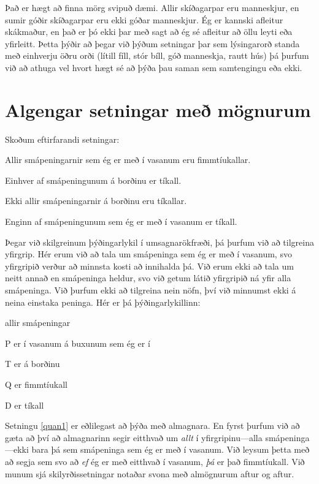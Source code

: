 Það er hægt að finna mörg svipuð dæmi. Allir skíðagarpar eru manneskjur, en sumir góðir skíðagarpar eru ekki góðar manneskjur. Ég er kannski afleitur skákmaður, en það er þó ekki þar með sagt að ég sé afleitur að öllu leyti eða yfirleitt. Þetta þýðir að þegar við þýðum setningar þar sem lýsingarorð standa með einhverju öðru orði (lítill fíll, stór bíll, góð manneskja, rautt hús) þá þurfum við að athuga vel hvort hægt sé að þýða þau saman sem samtengingu eða ekki.

\section{Algengar setningar með mögnurum}
Skoðum eftirfarandi setningar:
	\begin{earg}
		\item[\ex{quan1}] Allir smápeningarnir sem ég er með í vasanum eru fimmtíukallar.
		\item[\ex{quan2}] Einhver af smápeningunum á borðinu er tíkall.
		\item[\ex{quan3}] Ekki allir smápeningarnir á borðinu eru tíkallar.
		\item[\ex{quan4}] Enginn af smápeningunum sem ég er með í vasanum er tíkall.
	\end{earg}
Þegar við skilgreinum þýðingarlykil í umsagnarökfræði, þá þurfum við að tilgreina yfirgrip. Hér erum við að tala um smápeninga sem ég er með í vasanum, svo yfirgripið verður að minnsta kosti að innihalda þá. Við erum ekki að tala um neitt annað en smápeninga heldur, svo við getum látið yfirgripið ná yfir alla smápeninga. Við þurfum ekki að tilgreina nein nöfn, því við minnumst ekki á neina einstaka peninga. Hér er þá þýðingarlykillinn:

	\begin{ekey}
		\item[\text{yfirgrip}] allir smápeningar
		\item[P]  er í vasanum á buxunum sem ég er í
		\item[T]  er á borðinu
		\item[Q]  er fimmtíukall
		\item[D]  er tíkall
	\end{ekey}
Setningu \ref{quan1} er eðlilegast að þýða með almagnara. En fyrst þurfum við að gæta að því að almagnarinn segir eitthvað um \emph{allt} í yfirgripinu---alla smápeninga---ekki bara þá sem smápeninga sem ég er með í vasanum. Við leysum þetta með að segja sem svo að \emph{ef} ég er með eitthvað í vasanum, \emph{þá} er það fimmtíukall. Við munum sjá skilyrðissetningar notaðar svona með almögnurum aftur og aftur. 

